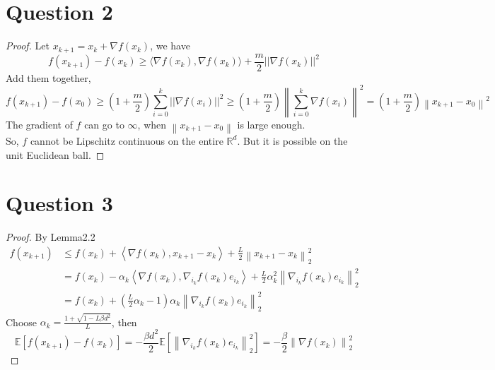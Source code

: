 \documentclass{article}
\begin{document}
\section*{Question 2}
    \begin{proof}
    Let $x_{k+1}=x_{k}+\nabla f(x_k)$, we have
    $$f(x_{k+1})-f(x_k)\geqslant \langle \nabla f(x_k),\nabla f(x_k) \rangle + \frac{m}{2}||\nabla f(x_k)||^2$$
    Add them together,
    $$f(x_{k+1})-f(x_0) \geqslant \left(1+\frac{m}{2}\right)\sum_{i=0}^{k} ||\nabla f(x_{i})||^2 \geqslant \left(1+\frac{m}{2}\right) \left\lVert \sum_{i=0}^{k} \nabla f(x_{i})\right\rVert^2 = \left(1+\frac{m}{2}\right)\left\lVert x_{k+1}-x_0 \right \rVert^2$$
    The gradient of $f$ can go to $\infty$, when $\left\lVert x_{k+1}-x_0 \right \rVert$ is large enough.\\
    So, $f$ cannot be Lipschitz continuous on the entire $\mathbb{R}^d$.
    But it is possible on the unit Euclidean ball.
    \end{proof}


\section*{Question 3}
    \begin{proof}
        By Lemma2.2
        \begin{align*}
            f(x_{k+1})
            &\leqslant f(x_k) 
                + \left\langle \nabla f(x_k), x_{k+1}-x_k \right\rangle 
                + \frac{L}{2} \left\lVert x_{k+1}-x_k \right \rVert_2^2\\
            &=f(x_k)
                -\alpha_k \left\langle \nabla f(x_k), \nabla_{i_k}f(x_k)e_{i_k} \right\rangle
                +\frac{L}{2} \alpha_k^2 \left\lVert \nabla_{i_k}f(x_k)e_{i_k} \right \rVert_2^2\\
            &=f(x_k)
                +\left(\frac{L}{2}\alpha_k -1\right)\alpha_k \left\lVert \nabla_{i_k}f(x_k)e_{i_k} \right \rVert_2^2
        \end{align*}
        Choose $\alpha_k = \frac{1+\sqrt{1-L\beta d^2}}{L}$, then
        $$\mathbb{E}[f(x_{k+1})-f(x_k)] = -\frac{\beta d^2}{2}\mathbb{E}[\left\lVert \nabla_{i_k}f(x_k)e_{i_k} \right \rVert_2^2]=-\frac{\beta}{2}\left\lVert \nabla f(x_k) \right \rVert_2^2$$
    \end{proof}


\end{document}
